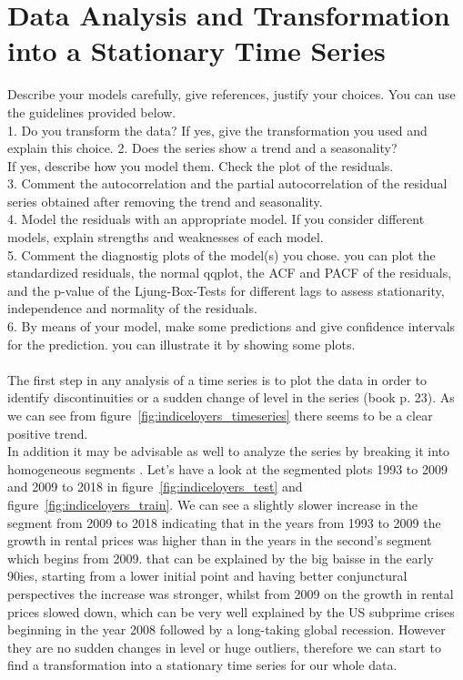 \documentclass[11pt,a4paper]{article}
\begin{document}
\section{Data Analysis and Transformation into a Stationary Time Series}
Describe your models carefully, give references, justify your choices. You can use the guidelines provided below.
\\1. Do you transform the data? If yes, give the transformation you used and explain this choice. 2. Does the series show a trend and a seasonality? 
\\If yes, describe how you model them. Check the plot of the residuals. 
\\3. Comment the autocorrelation and the partial autocorrelation of the residual series obtained after removing the trend and seasonality.
\\4. Model the residuals with an appropriate model. If you consider different models, explain strengths and weaknesses of each model.
\\5. Comment the diagnostig plots of the model(s) you chose. you can plot the standardized residuals, the normal qqplot, the ACF and PACF of the residuals, and the p-value of the Ljung-Box-Tests \citep{LjungBox78} for different lags to assess stationarity, independence and normality of the residuals.
\\6. By means of your model, make some predictions and give confidence intervals for the prediction. you can illustrate it by showing some plots.
\\
\\
The first step in any analysis of a time series is to plot the data in order to identify discontinuities or a sudden change of level in the series (book p. 23). As we can see from figure~\ref{fig:indiceloyers_timeseries} there seems to be a clear positive trend. 
\\In addition it may be advisable as well to analyze the series by breaking it into homogeneous segments \cite[p.~23]{bd02} . Let's have a look at the segmented plots  1993 to 2009 and 2009 to 2018 in figure~\ref{fig:indiceloyers_test} and figure~\ref{fig:indiceloyers_train}. We can see a slightly slower increase in the segment from 2009 to 2018 indicating that in the years from 1993 to 2009 the growth in rental prices was higher than in the years in the second's segment which begins from 2009. that can be explained by the big baisse in the early 90ies, starting from a lower initial point and having better conjunctural perspectives the increase was stronger, whilst from 2009 on the growth in rental prices slowed down, which can be very well explained by the US subprime crises beginning in the year 2008 followed by a long-taking global recession. However they are no sudden changes in level or huge outliers, therefore we can start to find a transformation into a stationary time series for our whole data.
\end{document}
